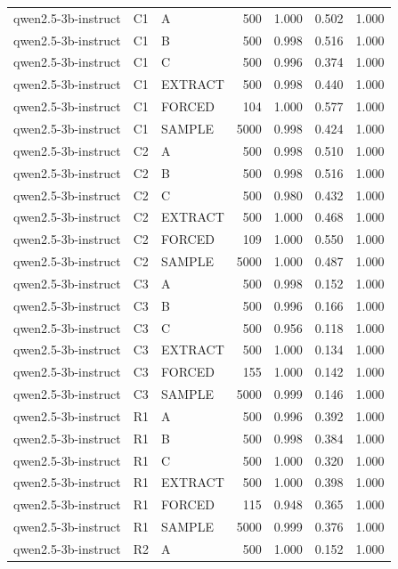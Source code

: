 \begin{table}
\begin{tabular}{lllrrrr}
qwen2.5-3b-instruct & C1 & A & 500 & 1.000 & 0.502 & 1.000 \\
qwen2.5-3b-instruct & C1 & B & 500 & 0.998 & 0.516 & 1.000 \\
qwen2.5-3b-instruct & C1 & C & 500 & 0.996 & 0.374 & 1.000 \\
qwen2.5-3b-instruct & C1 & EXTRACT & 500 & 0.998 & 0.440 & 1.000 \\
qwen2.5-3b-instruct & C1 & FORCED & 104 & 1.000 & 0.577 & 1.000 \\
qwen2.5-3b-instruct & C1 & SAMPLE & 5000 & 0.998 & 0.424 & 1.000 \\
qwen2.5-3b-instruct & C2 & A & 500 & 0.998 & 0.510 & 1.000 \\
qwen2.5-3b-instruct & C2 & B & 500 & 0.998 & 0.516 & 1.000 \\
qwen2.5-3b-instruct & C2 & C & 500 & 0.980 & 0.432 & 1.000 \\
qwen2.5-3b-instruct & C2 & EXTRACT & 500 & 1.000 & 0.468 & 1.000 \\
qwen2.5-3b-instruct & C2 & FORCED & 109 & 1.000 & 0.550 & 1.000 \\
qwen2.5-3b-instruct & C2 & SAMPLE & 5000 & 1.000 & 0.487 & 1.000 \\
qwen2.5-3b-instruct & C3 & A & 500 & 0.998 & 0.152 & 1.000 \\
qwen2.5-3b-instruct & C3 & B & 500 & 0.996 & 0.166 & 1.000 \\
qwen2.5-3b-instruct & C3 & C & 500 & 0.956 & 0.118 & 1.000 \\
qwen2.5-3b-instruct & C3 & EXTRACT & 500 & 1.000 & 0.134 & 1.000 \\
qwen2.5-3b-instruct & C3 & FORCED & 155 & 1.000 & 0.142 & 1.000 \\
qwen2.5-3b-instruct & C3 & SAMPLE & 5000 & 0.999 & 0.146 & 1.000 \\
qwen2.5-3b-instruct & R1 & A & 500 & 0.996 & 0.392 & 1.000 \\
qwen2.5-3b-instruct & R1 & B & 500 & 0.998 & 0.384 & 1.000 \\
qwen2.5-3b-instruct & R1 & C & 500 & 1.000 & 0.320 & 1.000 \\
qwen2.5-3b-instruct & R1 & EXTRACT & 500 & 1.000 & 0.398 & 1.000 \\
qwen2.5-3b-instruct & R1 & FORCED & 115 & 0.948 & 0.365 & 1.000 \\
qwen2.5-3b-instruct & R1 & SAMPLE & 5000 & 0.999 & 0.376 & 1.000 \\
qwen2.5-3b-instruct & R2 & A & 500 & 1.000 & 0.152 & 1.000 \\

\end{tabular}
\end{table}
